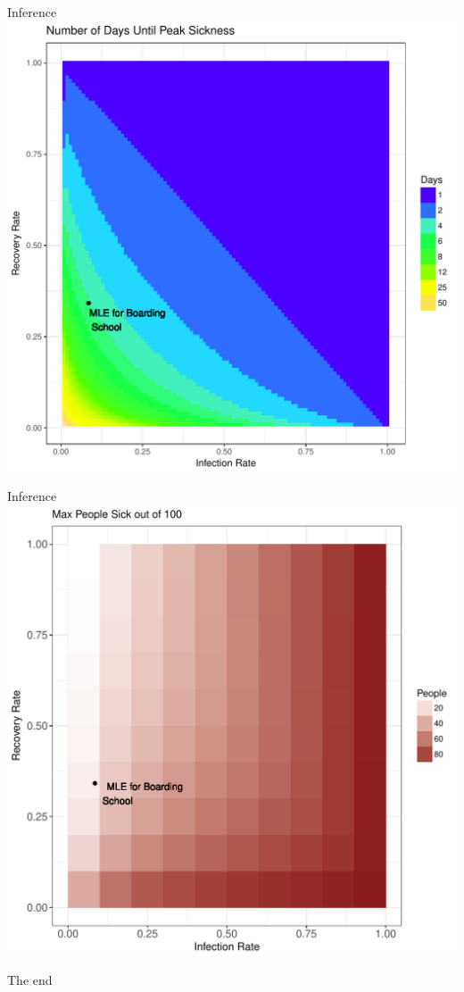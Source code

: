 \documentclass[10pt,table]{beamer}
\begin{document}
\begin{frame}{Inference}
\centering
\includegraphics[scale=.45]{DayGrid.pdf}
\end{frame}

\begin{frame}{Inference}
\centering
\includegraphics[scale=.45]{MaxGrid.pdf}
\end{frame}
\begin{frame}{}
The end
\end{frame}
\end{document}
